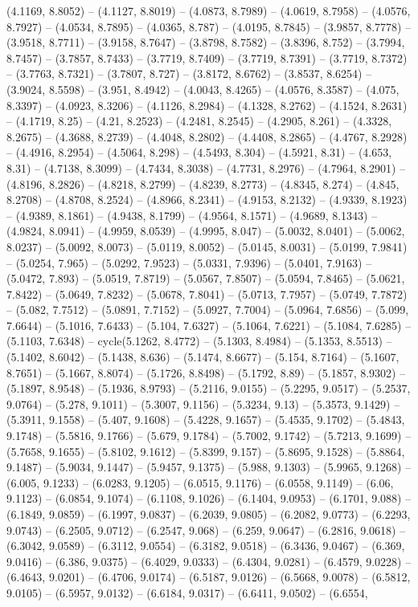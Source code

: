(4.1169, 8.8052) -- (4.1127, 8.8019) -- (4.0873, 8.7989) -- (4.0619, 8.7958) -- (4.0576, 8.7927) -- (4.0534, 8.7895) -- (4.0365, 8.787) -- (4.0195, 8.7845) -- (3.9857, 8.7778) -- (3.9518, 8.7711) -- (3.9158, 8.7647) -- (3.8798, 8.7582) -- (3.8396, 8.752) -- (3.7994, 8.7457) -- (3.7857, 8.7433) -- (3.7719, 8.7409) -- (3.7719, 8.7391) -- (3.7719, 8.7372) -- (3.7763, 8.7321) -- (3.7807, 8.727) -- (3.8172, 8.6762) -- (3.8537, 8.6254) -- (3.9024, 8.5598) -- (3.951, 8.4942) -- (4.0043, 8.4265) -- (4.0576, 8.3587) -- (4.075, 8.3397) -- (4.0923, 8.3206) -- (4.1126, 8.2984) -- (4.1328, 8.2762) -- (4.1524, 8.2631) -- (4.1719, 8.25) -- (4.21, 8.2523) -- (4.2481, 8.2545) -- (4.2905, 8.261) -- (4.3328, 8.2675) -- (4.3688, 8.2739) -- (4.4048, 8.2802) -- (4.4408, 8.2865) -- (4.4767, 8.2928) -- (4.4916, 8.2954) -- (4.5064, 8.298) -- (4.5493, 8.304) -- (4.5921, 8.31) -- (4.653, 8.31) -- (4.7138, 8.3099) -- (4.7434, 8.3038) -- (4.7731, 8.2976) -- (4.7964, 8.2901) -- (4.8196, 8.2826) -- (4.8218, 8.2799) -- (4.8239, 8.2773) -- (4.8345, 8.274) -- (4.845, 8.2708) -- (4.8708, 8.2524) -- (4.8966, 8.2341) -- (4.9153, 8.2132) -- (4.9339, 8.1923) -- (4.9389, 8.1861) -- (4.9438, 8.1799) -- (4.9564, 8.1571) -- (4.9689, 8.1343) -- (4.9824, 8.0941) -- (4.9959, 8.0539) -- (4.9995, 8.047) -- (5.0032, 8.0401) -- (5.0062, 8.0237) -- (5.0092, 8.0073) -- (5.0119, 8.0052) -- (5.0145, 8.0031) -- (5.0199, 7.9841) -- (5.0254, 7.965) -- (5.0292, 7.9523) -- (5.0331, 7.9396) -- (5.0401, 7.9163) -- (5.0472, 7.893) -- (5.0519, 7.8719) -- (5.0567, 7.8507) -- (5.0594, 7.8465) -- (5.0621, 7.8422) -- (5.0649, 7.8232) -- (5.0678, 7.8041) -- (5.0713, 7.7957) -- (5.0749, 7.7872) -- (5.082, 7.7512) -- (5.0891, 7.7152) -- (5.0927, 7.7004) -- (5.0964, 7.6856) -- (5.099, 7.6644) -- (5.1016, 7.6433) -- (5.104, 7.6327) -- (5.1064, 7.6221) -- (5.1084, 7.6285) -- (5.1103, 7.6348) -- cycle(5.1262, 8.4772) -- (5.1303, 8.4984) -- (5.1353, 8.5513) -- (5.1402, 8.6042) -- (5.1438, 8.636) -- (5.1474, 8.6677) -- (5.154, 8.7164) -- (5.1607, 8.7651) -- (5.1667, 8.8074) -- (5.1726, 8.8498) -- (5.1792, 8.89) -- (5.1857, 8.9302) -- (5.1897, 8.9548) -- (5.1936, 8.9793) -- (5.2116, 9.0155) -- (5.2295, 9.0517) -- (5.2537, 9.0764) -- (5.278, 9.1011) -- (5.3007, 9.1156) -- (5.3234, 9.13) -- (5.3573, 9.1429) -- (5.3911, 9.1558) -- (5.407, 9.1608) -- (5.4228, 9.1657) -- (5.4535, 9.1702) -- (5.4843, 9.1748) -- (5.5816, 9.1766) -- (5.679, 9.1784) -- (5.7002, 9.1742) -- (5.7213, 9.1699) -- (5.7658, 9.1655) -- (5.8102, 9.1612) -- (5.8399, 9.157) -- (5.8695, 9.1528) -- (5.8864, 9.1487) -- (5.9034, 9.1447) -- (5.9457, 9.1375) -- (5.988, 9.1303) -- (5.9965, 9.1268) -- (6.005, 9.1233) -- (6.0283, 9.1205) -- (6.0515, 9.1176) -- (6.0558, 9.1149) -- (6.06, 9.1123) -- (6.0854, 9.1074) -- (6.1108, 9.1026) -- (6.1404, 9.0953) -- (6.1701, 9.088) -- (6.1849, 9.0859) -- (6.1997, 9.0837) -- (6.2039, 9.0805) -- (6.2082, 9.0773) -- (6.2293, 9.0743) -- (6.2505, 9.0712) -- (6.2547, 9.068) -- (6.259, 9.0647) -- (6.2816, 9.0618) -- (6.3042, 9.0589) -- (6.3112, 9.0554) -- (6.3182, 9.0518) -- (6.3436, 9.0467) -- (6.369, 9.0416) -- (6.386, 9.0375) -- (6.4029, 9.0333) -- (6.4304, 9.0281) -- (6.4579, 9.0228) -- (6.4643, 9.0201) -- (6.4706, 9.0174) -- (6.5187, 9.0126) -- (6.5668, 9.0078) -- (6.5812, 9.0105) -- (6.5957, 9.0132) -- (6.6184, 9.0317) -- (6.6411, 9.0502) -- (6.6554, 